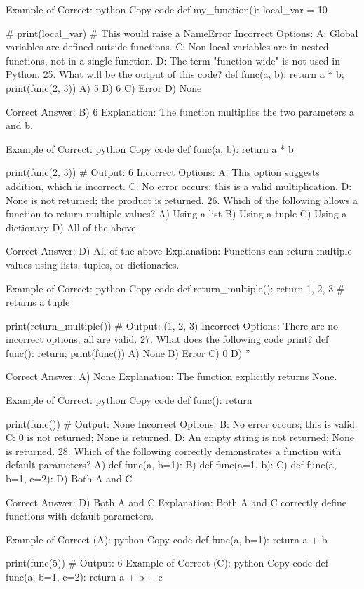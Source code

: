 Example of Correct:
python
Copy code
def my_function():
    local_var = 10

# print(local_var)  # This would raise a NameError
Incorrect Options:
A: Global variables are defined outside functions.
C: Non-local variables are in nested functions, not in a single function.
D: The term "function-wide" is not used in Python.
25. What will be the output of this code? def func(a, b): return a * b; print(func(2, 3))
A) 5
B) 6
C) Error
D) None

Correct Answer: B) 6
Explanation: The function multiplies the two parameters a and b.

Example of Correct:
python
Copy code
def func(a, b):
    return a * b

print(func(2, 3))  # Output: 6
Incorrect Options:
A: This option suggests addition, which is incorrect.
C: No error occurs; this is a valid multiplication.
D: None is not returned; the product is returned.
26. Which of the following allows a function to return multiple values?
A) Using a list
B) Using a tuple
C) Using a dictionary
D) All of the above

Correct Answer: D) All of the above
Explanation: Functions can return multiple values using lists, tuples, or dictionaries.

Example of Correct:
python
Copy code
def return_multiple():
    return 1, 2, 3  # returns a tuple

print(return_multiple())  # Output: (1, 2, 3)
Incorrect Options: There are no incorrect options; all are valid.
27. What does the following code print? def func(): return; print(func())
A) None
B) Error
C) 0
D) ''

Correct Answer: A) None
Explanation: The function explicitly returns None.

Example of Correct:
python
Copy code
def func():
    return

print(func())  # Output: None
Incorrect Options:
B: No error occurs; this is valid.
C: 0 is not returned; None is returned.
D: An empty string is not returned; None is returned.
28. Which of the following correctly demonstrates a function with default parameters?
A) def func(a, b=1):
B) def func(a=1, b):
C) def func(a, b=1, c=2):
D) Both A and C

Correct Answer: D) Both A and C
Explanation: Both A and C correctly define functions with default parameters.

Example of Correct (A):
python
Copy code
def func(a, b=1):
    return a + b

print(func(5))  # Output: 6
Example of Correct (C):
python
Copy code
def func(a, b=1, c=2):
    return a + b + c


